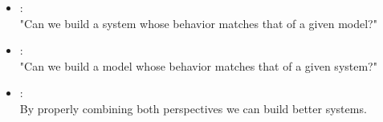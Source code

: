 \documentclass[pdf]{beamer}
\newcommand{\red}[1]{\color{darkred}{#1}\normalcolor }
\newcommand{\blue}[1]{\color{blue}{#1}\normalcolor }
\begin{document}
{\begin{columns}
\begin{column}{0.65\textwidth}
{\begin{itemize}
					\item
					\red{Engineering perspective}:\\ "Can we build a system whose behavior matches that of a given model?"
					\item
					\red{Science perspective}:\\ "Can we build a model whose behavior matches that of a given system?" 
					\item
					\blue{This talk}:\\
					By properly combining both perspectives we can build better systems. 
				\end{itemize}
			}
		\end{column}
	\end{columns}
}




\end{document}
